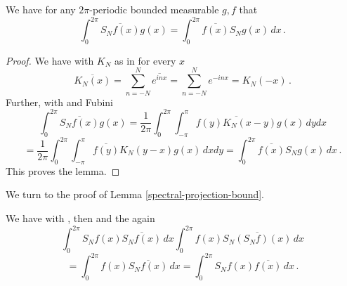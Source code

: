 \begin{lemma}
\label{partial-sum-selfadjoint}
    We have for any $2\pi$-periodic bounded measurable $g,f$ that
    \begin{equation}
       \int_0^{2\pi} \overline{S_Nf(x)} g(x)=\int_0^{2\pi} \overline{f(x)} S_Ng(x)\, dx\, .
    \end{equation}
\end{lemma}
\begin{proof}
  We have with $K_N$ as in  for every $x$
  \begin{equation}
      \overline{K_N(x)}=\sum_{n=-N}^N\overline{ e^{in x}}=
      {\sum_{n=-N}^N e^{-in x}}=K_N(-x)\, .
  \end{equation}
 Further, with  and Fubini
\begin{equation*}
\int_0^{2\pi} \overline{S_Nf(x)} g(x)
= \frac 1{2\pi} \int_0^{2\pi} \int_{-\pi}^{\pi}\overline{f(y) K_N(x-y)} g(x)\, dy dx
 \end{equation*}
 \begin{equation}
=
\frac 1{2\pi} \int_0^{2\pi} \int_{-\pi}^{\pi}\overline{f(y)} K_N(y-x)
g(x)\, dx dy
=\int_0^{2\pi} \overline{f(x)} S_Ng(x)\, dx
\, .
\end{equation}
 This proves the lemma.
\end{proof}


We turn to the proof of Lemma
\ref{spectral-projection-bound}.

We have with , then  and the  again
\begin{equation*}
 \int_0^{2\pi} S_Nf(x)\overline{S_Nf(x)}\, dx
 \int_0^{2\pi} f(x)\overline{S_N(S_Nf)(x)}\, dx
\end{equation*}
\begin{equation}\label{eqhil7}
 =\int_0^{2\pi} f(x)\overline{S_Nf(x)}\, dx=
 \int_0^{2\pi} S_N f(x)\overline{f(x)}\, dx\, .
\end{equation}

